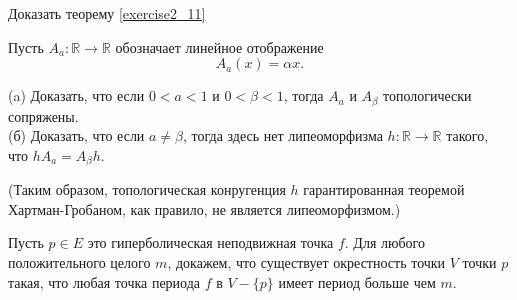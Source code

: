 \begin{exercise}
\label{exercise2_10} 
Доказать теорему \ref{exercise2_11} 
\end{exercise} 

\begin{exercise}
\label{exercise2_11} 
Пусть $A_a : \mathbb{R} \rightarrow \mathbb{R}$ обозначает линейное отображение 
$$
A_a(x) = \alpha x.
$$

(a) Доказать, что если $0 < a < 1$ и $0 < \beta < 1$, тогда $A_a$ и $A_{\beta}$ топологически сопряжены. \\

(б) Доказать, что если $a \neq \beta$, тогда здесь нет липеоморфизма $h :\mathbb{R} \rightarrow \mathbb{R}$ такого, что  $hA_a = A_{\beta}h$.

(Таким образом, топологическая конругенция $h$ гарантированная теоремой Хартман-Гробаном, как правило, не является липеоморфизмом.)
\end{exercise} 

\begin{exercise}
\label{exercise2_10} 
Пусть $p \in E$ это гиперболическая неподвижная точка $f$. Для любого положительного целого $m$, докажем, что существует окрестность точки $V$ точки $p$ такая, что любая точка периода $f$ в $V - \{p\}$ имеет период больше чем $m$.
\end{exercise} 
